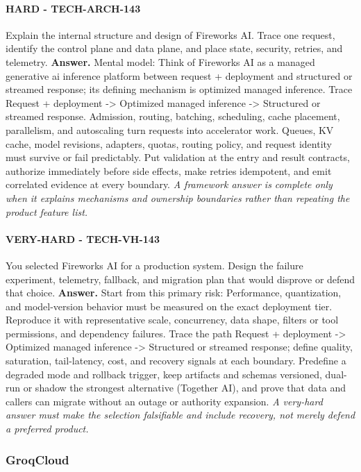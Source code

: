\paragraph{HARD - TECH-ARCH-143} Explain the internal structure and design of Fireworks AI. Trace one request, identify the control plane and data plane, and place state, security, retries, and telemetry.
\textbf{Answer.} Mental model: Think of Fireworks AI as a managed generative ai inference platform between request + deployment and structured or streamed response; its defining mechanism is optimized managed inference. Trace Request + deployment -> Optimized managed inference -> Structured or streamed response. Admission, routing, batching, scheduling, cache placement, parallelism, and autoscaling turn requests into accelerator work. Queues, KV cache, model revisions, adapters, quotas, routing policy, and request identity must survive or fail predictably. Put validation at the entry and result contracts, authorize immediately before side effects, make retries idempotent, and emit correlated evidence at every boundary.
\textit{A framework answer is complete only when it explains mechanisms and ownership boundaries rather than repeating the product feature list.}
\paragraph{VERY-HARD - TECH-VH-143} You selected Fireworks AI for a production system. Design the failure experiment, telemetry, fallback, and migration plan that would disprove or defend that choice.
\textbf{Answer.} Start from this primary risk: Performance, quantization, and model-version behavior must be measured on the exact deployment tier. Reproduce it with representative scale, concurrency, data shape, filters or tool permissions, and dependency failures. Trace the path Request + deployment -> Optimized managed inference -> Structured or streamed response; define quality, saturation, tail-latency, cost, and recovery signals at each boundary. Predefine a degraded mode and rollback trigger, keep artifacts and schemas versioned, dual-run or shadow the strongest alternative (Together AI), and prove that data and callers can migrate without an outage or authority expansion.
\textit{A very-hard answer must make the selection falsifiable and include recovery, not merely defend a preferred product.}
\subsubsection*{GroqCloud}
